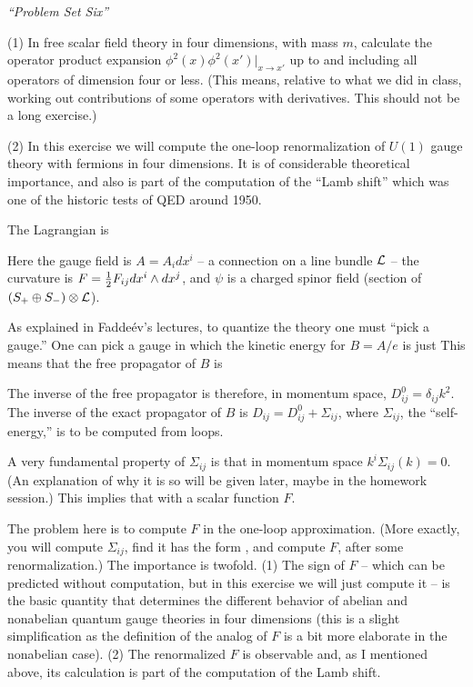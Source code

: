 



{\it ``Problem Set Six''}

(1) In free scalar field theory in four dimensions,
with mass $m$, 
calculate the operator product expansion
$\phi^2(x)\phi^2(x')|_{x\to x'}$ up to and including
all operators of dimension four or less.  (This means,
relative to what we did in class, working out contributions
of some operators with derivatives.  This should not be a long
exercise.)

(2)  In this exercise we will compute the one-loop renormalization
of $U(1)$ gauge theory with fermions in four dimensions.  It is
of considerable theoretical importance, and also is part of the
computation of the ``Lamb shift'' which was one of the historic
tests of QED around 1950.

The Lagrangian is

\eqn{}
Here the gauge field is $A=A_i dx^i$ -- a connection on 
a line bundle ${\cal L}$ --  the curvature is
$F={\textstyle{1\over2}} F_{ij}dx^i\wedge dx^j$, and $\psi$ is a charged
spinor field (section of $(S_+\oplus S_-)\otimes {\cal L}$).

As explained in Fadde\'ev's lectures, to quantize the theory
one must ``pick a gauge.'' One can pick a gauge in which the
kinetic energy for $B=A/e$ is just
\eqn{}
This means that the free propagator of $B$ is
\eqn{}

The inverse of the free propagator is therefore, in momentum
space, $ D_{ij}^0=\delta_{ij}k^2$.
The inverse of the exact propagator of $B$ is $D_{ij}=D_{ij}^0+
\Sigma_{ij}$, where $\Sigma_{ij}$, the ``self-energy,'' is
to be computed from loops.

A very fundamental property of $\Sigma_{ij}$ is that in momentum space
$k^i\Sigma_{ij}(k)=0$.  (An explanation of why it is so will
be given later, maybe in the homework session.) This implies that
\eqn{}
with a scalar function $F$.  

The problem here is to compute $F$ in the one-loop approximation.
(More exactly, you will compute $\Sigma_{ij}$, find it has the
form \hobbo, and compute $F$, after some renormalization.)
The importance is twofold. (1) The sign of $F$ -- which can be predicted
without computation, but in this exercise we will just compute
it -- is the basic quantity that determines the different
behavior of abelian and nonabelian quantum gauge theories in
four dimensions (this is a slight simplification as the definition
of the analog of $F$ is a bit more elaborate in the nonabelian case).
(2) The renormalized $F$ is observable and, as I mentioned above,
its calculation is part of the  computation of the Lamb shift.

